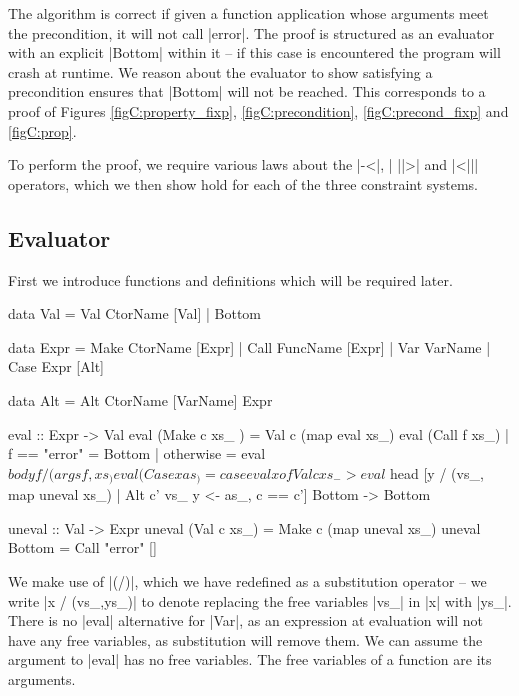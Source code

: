 \newcommand{\lemma}[1]{(\textit{#1})}
\newcommand{\theorem}[2]{#2 \hspace{5mm} \lemma{#1} \\}
\newcommand{\proof}[2][]{\paragraph{\lemma{#2} \textsf{#1}}}

The algorithm is correct if given a function application whose arguments meet the precondition, it will not call |error|. The proof is structured as an evaluator with an explicit |Bottom| within it -- if this case is encountered the program will crash at runtime. We reason about the evaluator to show satisfying a precondition ensures that |Bottom| will not be reached. This corresponds to a proof of Figures \ref{figC:property_fixp}, \ref{figC:precondition}, \ref{figC:precond_fixp} and \ref{figC:prop}.

To perform the proof, we require various laws about the |-<|, | ||>| and |<||| operators, which we then show hold for each of the three constraint systems.

\subsection{Evaluator}

First we introduce functions and definitions which will be required later.

\begin{code}
data Val  =  Val CtorName [Val]
          |  Bottom

data Expr  =  Make CtorName [Expr]
           |  Call FuncName [Expr]
           |  Var  VarName
           |  Case Expr [Alt]

data Alt = Alt CtorName [VarName] Expr

eval :: Expr -> Val
eval (Make c xs_   ) = Val c (map eval xs_)
eval (Call f xs_)  | f == "error" = Bottom
                   | otherwise = eval $ body f / (args f, xs_)
eval (Case x as_  ) = case eval x of
    Val c xs_ -> eval $ head [y / (vs_, map uneval xs_) | Alt c' vs_ y <- as_, c == c']
    Bottom -> Bottom

uneval :: Val -> Expr
uneval (Val c xs_)  = Make c (map uneval xs_)
uneval Bottom       = Call "error" []
\end{code}

We make use of |(/)|, which we have redefined as a substitution operator -- we write |x / (vs_,ys_)| to denote replacing the free variables |vs_| in |x| with |ys_|. There is no |eval| alternative for |Var|, as an expression at evaluation will not have any free variables, as substitution will remove them. We can assume the argument to |eval| has no free variables. The free variables of a function are its arguments.


